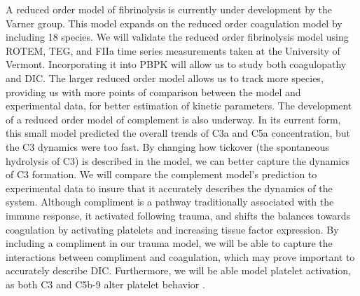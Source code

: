 \documentclass[11pt]{article}
\begin{document}
A reduced order model of fibrinolysis is currently under development by the Varner group. This model expands on the reduced order coagulation model by including 18 species. We will validate the reduced order fibrinolysis model using ROTEM, TEG, and FIIa time series measurements taken at the University of Vermont. Incorporating it into PBPK will allow us to study both coagulopathy and DIC. The larger reduced order model allows us to track more species, providing us with more points of comparison between the model and experimental data, for better estimation of kinetic parameters. The development of a reduced order model of complement is also underway. In its current form, this small model predicted the overall trends of C3a and C5a concentration, but the C3 dynamics were too fast. By changing how tickover (the spontaneous hydrolysis of C3) is described in the model, we can better capture the dynamics of C3 formation.  We will compare the complement model's prediction to experimental data to insure that it accurately describes the dynamics of the system.\cite{morad2015time} Although compliment is a pathway traditionally associated with the immune response, it activated following trauma, and shifts the balances towards coagulation by activating platelets and increasing tissue factor expression. \cite{markiewski2007complement} By including a compliment in our trauma model, we will be able to capture the interactions between compliment and coagulation, which may prove important to accurately describe DIC. Furthermore, we will be able model platelet activation, as both C3 and C5b-9 alter platelet behavior \cite{peerschke2008platelet}.
\end{document}
